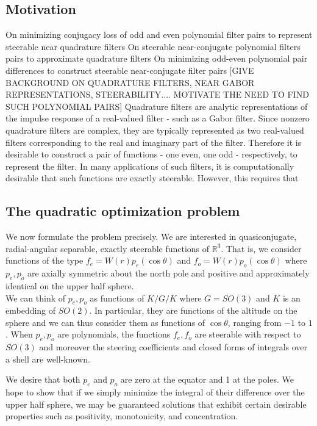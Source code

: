 \documentclass{article}
\theoremstyle{definition}
\theoremstyle{remark}
\numberwithin{equation}{section}
\begin{document}
\subsection{Motivation}
On minimizing conjugacy loss of odd and even polynomial filter pairs to represent steerable near quadrature filters
On steerable near-conjugate polynomial filters pairs to approximate quadrature filters
On minimizing odd-even polynomial pair differences to construct steerable near-conjugate filter pairs
[GIVE BACKGROUND ON QUADRATURE FILTERS, NEAR GABOR REPRESENTATIONS, STEERABILITY.... MOTIVATE THE NEED TO FIND SUCH POLYNOMIAL PAIRS]
Quadrature filters are analytic representations of the impulse response of a real-valued filter - such as a Gabor filter. Since nonzero quadrature filters are complex, they are typically represented as two real-valued filters corresponding to the real and imaginary part of the filter. Therefore it is desirable to construct a pair of functions - one even, one odd - respectively, to represent the filter. In many applications of such filters, it is computationally desirable that such functions are exactly steerable. However, this requires that 

\subsection{The quadratic optimization problem}
\label{problem}

We now formulate the problem precisely. We are interested in quasiconjugate, radial-angular separable, exactly steerable functions of $\mathbb{R}^3$. That is, we consider functions of the type $f_e = W(r)p_e(\cos \theta)$ and $f_o = W(r)p_o(\cos \theta)$ where $p_e, p_o$ are axially symmetric about the north pole and positive and approximately identical on the upper half sphere. \\

We can think of $p_e, p_o$ as functions of $K/G/K$ where $G=SO(3)$ and $K$ is an embedding of $SO(2)$. In particular, they are functions of the altitude on the sphere and we can thus consider them as functions of $\cos \theta$, ranging from $-1$ to $1$. When $p_e, p_o$ are polynomials, the functions $f_e, f_o$ are steerable with respect to $SO(3)$ and moreover the steering coefficients and closed forms of integrals over a shell are well-known. 

We desire that both $p_e$ and $p_o$ are zero at the equator and 1 at the poles. We hope to show that if we simply minimize the integral of their difference over the upper half sphere, we may be guaranteed solutions that exhibit certain desirable properties such as positivity, monotonicity, and concentration. \\
\end{document}
